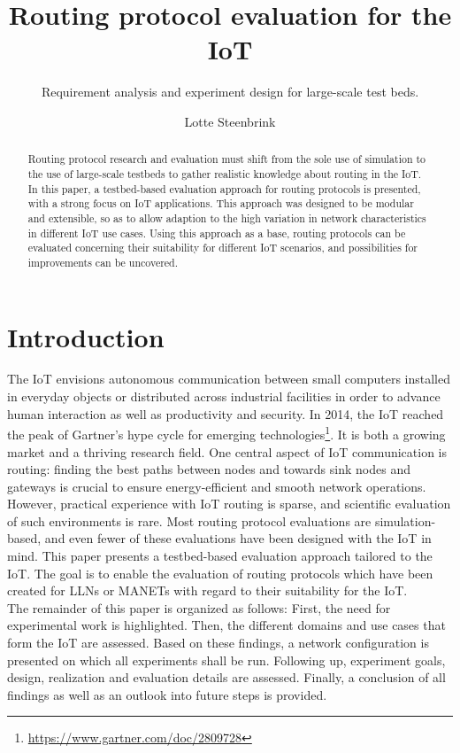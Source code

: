\documentclass{acm_proc_article-sp}
\begin{document}
\title{Routing protocol evaluation for the IoT}
\subtitle{Requirement analysis and experiment design for large-scale test beds.}

\author{
\alignauthor
Lotte Steenbrink
}

\maketitle
\begin{abstract}
Routing protocol research and evaluation must shift from the sole use of simulation to the use of large-scale testbeds to gather realistic knowledge about routing in the IoT.
In this paper, a testbed-based evaluation approach for routing protocols is presented, with a strong focus on IoT applications. This approach was designed to be modular and extensible, so as to allow adaption to the high variation in network characteristics in different IoT use cases. Using this approach as a base, routing protocols can be evaluated concerning their suitability for different IoT scenarios, and possibilities for improvements can be uncovered.
\end{abstract}


\section{Introduction}
\label{sec:Intro}
The \gls{IoT} envisions autonomous communication between small computers installed in everyday objects or distributed across industrial facilities in order to advance human interaction as well as productivity and security.
In 2014, the \gls{IoT} reached the peak of Gartner's hype cycle for emerging technologies\footnote{ \url{https://www.gartner.com/doc/2809728}}. It is both a growing market and a thriving research field.
One central aspect of IoT communication is routing: finding the best paths between nodes and towards sink nodes and gateways is crucial to ensure energy-efficient and smooth network operations. However, practical experience with IoT routing is sparse, and scientific evaluation of such environments is rare. Most routing protocol evaluations are simulation-based, and even fewer of these evaluations have been designed with the IoT in mind.
This paper presents a testbed-based evaluation approach tailored to the IoT. The goal is to enable the evaluation of routing protocols which have been created for \glspl{LLN} or \glspl{MANET} with regard to their suitability for the IoT.\\
The remainder of this paper is organized as follows:
First, the need for experimental work is highlighted. Then, the different domains and use cases that form the IoT are assessed. Based on these findings, a network configuration is presented on which all experiments shall be run. Following up, experiment goals, design, realization and evaluation details are assessed. Finally, a conclusion of all findings as well as an outlook into future steps is provided.
\end{document}
